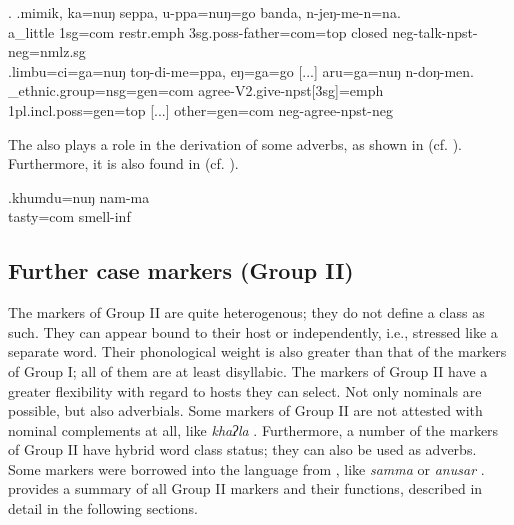		\ex. \ag.mimik,   ka=nuŋ    seppa,         u-ppa=nuŋ=go                   banda, n-jeŋ-me-n=na.\\
		a\_little {\sc 1sg=com} {\sc restr.emph} {\sc 3sg.poss-}father{\sc =com=top} closed {\sc neg-}talk{\sc [3sg]-npst-neg=nmlz.sg}\\
		 
 	\bg.limbu=ci=ga=nuŋ toŋ-di-me=ppa,  eŋ=ga=go [...] aru=ga=nuŋ        n-doŋ-men.\\
			\_ethnic.group{\sc =nsg=gen=com}  agree{\sc -V2.give-npst[3sg]=emph} {\sc 1pl.incl.poss=gen=top} [...] other{\sc =gen=com} {\sc neg-}agree{\sc [3sg]-npst-neg}\\
		 
	

		
The  also plays a role in the derivation of some adverbs, as shown in \Next (cf.  ). Furthermore, it is also found in  (cf.  ).


\exg.khumdu=nuŋ nam-ma\\
			tasty{\sc =com} smell{\sc -inf}\\


\subsection{Further case markers (Group II)}\label{postpos}
  
The markers of Group II are quite heterogenous; they do not define a class as such. They can appear bound to their host or independently, i.e., stressed like a separate word. Their phonological weight is also greater than that of the markers of Group I; all of them are at least disyllabic.  The  markers of Group II  have a greater flexibility with regard to hosts they can select. Not only nominals are possible, but also adverbials. Some markers of Group II  are not attested with nominal complements at all, like \emph{khaʔla} .  Furthermore, a number of the markers of Group II have hybrid word class status; they can also be used as adverbs. Some markers were borrowed into the language from , like \emph{samma}  or \emph{anusar} .   provides a summary of all Group II markers and their functions, described in detail in the following sections.
 
